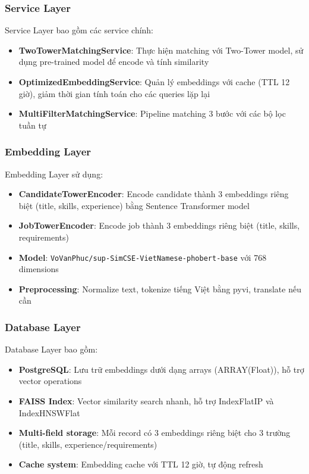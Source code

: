 \subsubsection{Service Layer}

Service Layer bao gồm các service chính:

\begin{itemize}
    \item \textbf{TwoTowerMatchingService}: Thực hiện matching với Two-Tower model, sử dụng pre-trained model để encode và tính similarity
    \item \textbf{OptimizedEmbeddingService}: Quản lý embeddings với cache (TTL 12 giờ), giảm thời gian tính toán cho các queries lặp lại
    \item \textbf{MultiFilterMatchingService}: Pipeline matching 3 bước với các bộ lọc tuần tự
\end{itemize}

\subsubsection{Embedding Layer}

Embedding Layer sử dụng:

\begin{itemize}
    \item \textbf{CandidateTowerEncoder}: Encode candidate thành 3 embeddings riêng biệt (title, skills, experience) bằng Sentence Transformer model
    \item \textbf{JobTowerEncoder}: Encode job thành 3 embeddings riêng biệt (title, skills, requirements)
    \item \textbf{Model}: \texttt{VoVanPhuc/sup-SimCSE-VietNamese-phobert-base} với 768 dimensions
    \item \textbf{Preprocessing}: Normalize text, tokenize tiếng Việt bằng pyvi, translate nếu cần
\end{itemize}

\subsubsection{Database Layer}

Database Layer bao gồm:

\begin{itemize}
    \item \textbf{PostgreSQL}: Lưu trữ embeddings dưới dạng arrays (ARRAY(Float)), hỗ trợ vector operations
    \item \textbf{FAISS Index}: Vector similarity search nhanh, hỗ trợ IndexFlatIP và IndexHNSWFlat
    \item \textbf{Multi-field storage}: Mỗi record có 3 embeddings riêng biệt cho 3 trường (title, skills, experience/requirements)
    \item \textbf{Cache system}: Embedding cache với TTL 12 giờ, tự động refresh
\end{itemize}

